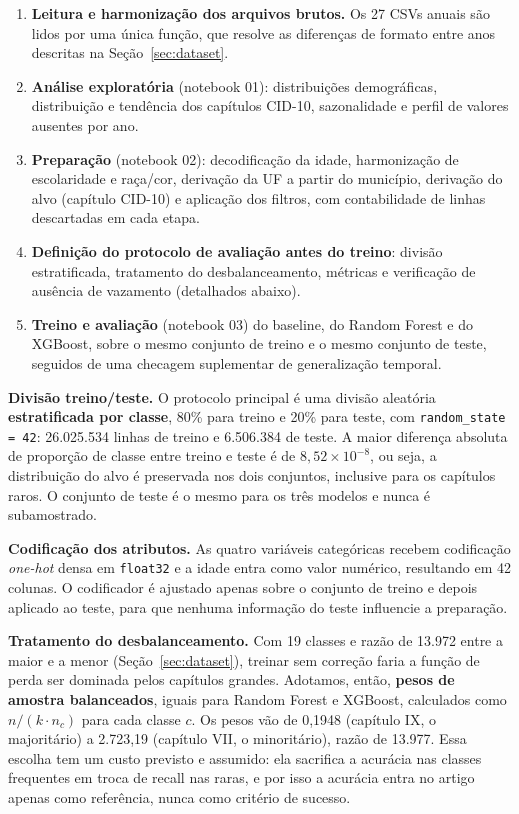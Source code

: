 \documentclass[12pt]{article}
\begin{document}
\begin{enumerate}
  \item \textbf{Leitura e harmonização dos arquivos brutos.} Os 27 CSVs anuais
    são lidos por uma única função, que resolve as diferenças de formato entre
    anos descritas na Seção~\ref{sec:dataset}.
  \item \textbf{Análise exploratória} (notebook 01): distribuições
    demográficas, distribuição e tendência dos capítulos CID-10, sazonalidade
    e perfil de valores ausentes por ano.
  \item \textbf{Preparação} (notebook 02): decodificação da idade,
    harmonização de escolaridade e raça/cor, derivação da UF a partir do
    município, derivação do alvo (capítulo CID-10) e aplicação dos filtros,
    com contabilidade de linhas descartadas em cada etapa.
  \item \textbf{Definição do protocolo de avaliação antes do treino}: divisão
    estratificada, tratamento do desbalanceamento, métricas e verificação de
    ausência de vazamento (detalhados abaixo).
  \item \textbf{Treino e avaliação} (notebook 03) do baseline, do Random
    Forest e do XGBoost, sobre o mesmo conjunto de treino e o mesmo conjunto
    de teste, seguidos de uma checagem suplementar de generalização temporal.
\end{enumerate}

\textbf{Divisão treino/teste.} O protocolo principal é uma divisão aleatória
\textbf{estratificada por classe}, 80\% para treino e 20\% para teste, com
\texttt{random\_state = 42}: 26.025.534 linhas de treino e 6.506.384 de teste.
A maior diferença absoluta de proporção de classe entre treino e teste é de
$8{,}52 \times 10^{-8}$, ou seja, a distribuição do alvo é preservada nos dois
conjuntos, inclusive para os capítulos raros. O conjunto de teste é o mesmo
para os três modelos e nunca é subamostrado.

\textbf{Codificação dos atributos.} As quatro variáveis categóricas recebem
codificação \emph{one-hot} densa em \texttt{float32} e a idade entra como
valor numérico, resultando em 42 colunas. O codificador é ajustado apenas
sobre o conjunto de treino e depois aplicado ao teste, para que nenhuma
informação do teste influencie a preparação.

\textbf{Tratamento do desbalanceamento.} Com 19 classes e razão de 13.972
entre a maior e a menor (Seção~\ref{sec:dataset}), treinar sem correção faria
a função de perda ser dominada pelos capítulos grandes. Adotamos, então,
\textbf{pesos de amostra balanceados}, iguais para Random Forest e XGBoost,
calculados como $n/(k \cdot n_c)$ para cada classe $c$. Os pesos vão de 0,1948
(capítulo IX, o majoritário) a 2.723,19 (capítulo VII, o minoritário), razão
de 13.977. Essa escolha tem um custo previsto e assumido: ela sacrifica a
acurácia nas classes frequentes em troca de recall nas raras, e por isso a
acurácia entra no artigo apenas como referência, nunca como critério de
sucesso.
\end{document}
